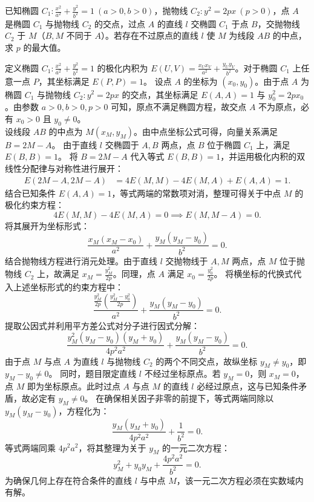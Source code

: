 \begin{exercise}
已知椭圆 \(C_1: \frac{x^2}{a^2} + \frac{y^2}{b^2} = 1\ (a>0,b>0)\)，抛物线 \(C_2: y^2 = 2px\ (p>0)\)，点 \(A\) 是椭圆 \(C_1\) 与抛物线 \(C_2\) 的交点，过点 \(A\) 的直线 \(l\) 交椭圆 \(C_1\) 于点 \(B\)，交抛物线 \(C_2\) 于 \(M\)（\(B,M\) 不同于 \(A\)）。若存在不过原点的直线 \(l\) 使 \(M\) 为线段 \(AB\) 的中点，求 \(p\) 的最大值。
\end{exercise}
\begin{solution}
定义椭圆 $C_1: \frac{x^2}{a^2} + \frac{y^2}{b^2} = 1$ 的极化内积为 $E(U, V) = \frac{x_U x_V}{a^2} + \frac{y_U y_V}{b^2}$。对于椭圆 $C_1$ 上任意一点 $P$，其坐标满足 $E(P, P) = 1$。
设点 $A$ 的坐标为 $(x_0, y_0)$。由于点 $A$ 为椭圆 $C_1$ 与抛物线 $C_2: y^2 = 2px$ 的交点，其坐标满足 $E(A, A) = 1$ 与 $y_0^2 = 2px_0$。由参数 $a>0, b>0, p>0$ 可知，原点不满足椭圆方程，故交点 $A$ 不为原点，必有 $x_0 > 0$ 且 $y_0 \neq 0$。\\
设线段 $AB$ 的中点为 $M(x_M, y_M)$。由中点坐标公式可得，向量关系满足 $B = 2M - A$。
由于直线 $l$ 交椭圆于 $A, B$ 两点，点 $B$ 位于椭圆 $C_1$ 上，满足 $E(B, B) = 1$。
将 $B = 2M - A$ 代入等式 $E(B,B)=1$，并运用极化内积的双线性分配律与对称性进行展开：
\begin{align*}
E(2M - A, 2M - A) &= 4E(M, M) - 4E(M, A) + E(A, A) = 1.
\end{align*}
结合已知条件 $E(A, A) = 1$，等式两端的常数项对消，整理可得关于中点 $M$ 的极化约束方程：
\[ 4E(M, M) - 4E(M, A) = 0 \implies E(M, M - A) = 0. \]
将其展开为坐标形式：
\[ \frac{x_M(x_M - x_0)}{a^2} + \frac{y_M(y_M - y_0)}{b^2} = 0. \]
结合抛物线方程进行消元处理。由于直线 $l$ 交抛物线于 $A, M$ 两点，点 $M$ 位于抛物线 $C_2$ 上，故满足 $x_M = \frac{y_M^2}{2p}$。同理，点 $A$ 满足 $x_0 = \frac{y_0^2}{2p}$。
将横坐标的代换式代入上述坐标形式的约束方程中：
\[ \frac{\frac{y_M^2}{2p} \left( \frac{y_M^2 - y_0^2}{2p} \right)}{a^2} + \frac{y_M(y_M - y_0)}{b^2} = 0. \]
提取公因式并利用平方差公式对分子进行因式分解：
\[ \frac{y_M^2(y_M - y_0)(y_M + y_0)}{4p^2 a^2} + \frac{y_M(y_M - y_0)}{b^2} = 0. \]
由于点 $M$ 与点 $A$ 为直线 $l$ 与抛物线 $C_2$ 的两个不同交点，故纵坐标 $y_M \neq y_0$，即 $y_M - y_0 \neq 0$。
同时，题目限定直线 $l$ 不经过坐标原点。若 $y_M = 0$，则 $x_M = 0$，点 $M$ 即为坐标原点。此时过点 $A$ 与点 $M$ 的直线 $l$ 必经过原点，这与已知条件矛盾，故必定有 $y_M \neq 0$。
在确保相关因子非零的前提下，等式两端同除以 $y_M(y_M - y_0)$，方程化为：
\[ \frac{y_M(y_M + y_0)}{4p^2 a^2} + \frac{1}{b^2} = 0. \]
等式两端同乘 $4p^2 a^2$，将其整理为关于 $y_M$ 的一元二次方程：
\[ y_M^2 + y_0 y_M + \frac{4p^2 a^2}{b^2} = 0. \]
为确保几何上存在符合条件的直线 $l$ 与中点 $M$，该一元二次方程必须在实数域内有解。

\end{solution}

